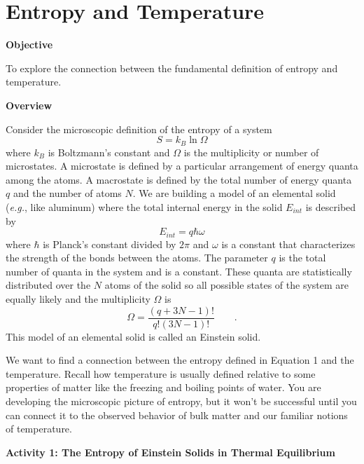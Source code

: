 \setcounter{equation}{0}
\setcounter{figure}{0}

\section{Entropy and Temperature}

\makelabheader %

\textbf{Objective}

To explore the connection between the fundamental definition of entropy and
temperature.

\textbf{Overview}

Consider the microscopic  definition of the entropy of a system
\begin{equation}
S = k_B \ln \Omega
\end{equation}
where $k_B$ is Boltzmann's constant and $\Omega$ is the multiplicity or number of 
microstates.
A microstate is defined by a particular arrangement of energy quanta among the
atoms.
A macrostate is defined by the total number of energy quanta $q$ and the number of atoms $N$.
We are building a model of an elemental solid ({\it e.g.}, like aluminum)
where
the total internal energy in the solid $E_{int}$ is described by
\begin{equation}
E_{int} = q \hbar \omega 
\end{equation}
where $\hbar$ is Planck's constant divided by $2\pi$ and $\omega$ is a constant that
characterizes the strength of the bonds between the atoms.
The parameter 
$q$ is the total number of quanta in the system and is a constant.
These quanta are statistically distributed over the $N$ atoms of the solid so
all possible states of the system are equally likely and the multiplicity $\Omega$
is
\begin{equation}
\Omega = \frac{(q+3N-1)!}{q!(3N-1)!} \qquad .
\end{equation}
This model of an elemental solid is called an Einstein solid.

We want to find a connection between the entropy defined in Equation 1 and the
temperature.
Recall how temperature is usually defined
relative to some properties of matter like the freezing and 
boiling points of water.
You are developing the microscopic picture of entropy, but it won't be successful until
you can connect it to the observed behavior of bulk matter and our familiar notions of 
temperature.

\textbf{Activity 1: The Entropy of Einstein Solids in Thermal Equilibrium}

